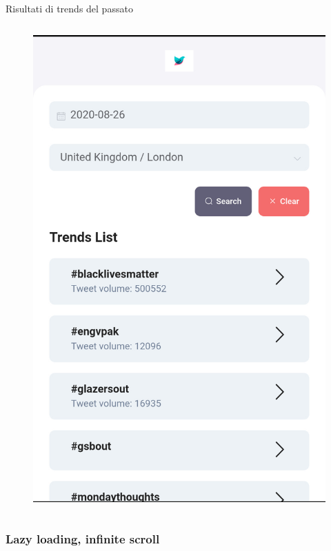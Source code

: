 \documentclass[xcolor=svgnames, aspectratio=169]{beamer}
\begin{document}
\begin{frame}{Risultati di trends del passato}
\begin{columns}[t]
        \begin{figure}[H]
            \centering
            \includegraphics[width=0.32\paperwidth,height=0.7\paperheight,keepaspectratio]{Mobile_Chrome_Ricerca_trends_a_Londra_26_agosto.jpg}
        \end{figure}
    \end{columns}
\end{frame}


\subsubsection{Lazy loading, infinite scroll}
\end{document}
